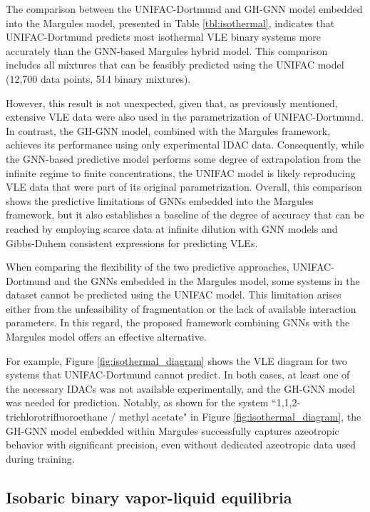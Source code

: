 The comparison between the UNIFAC-Dortmund and GH-GNN model embedded into the Margules model, presented in Table \ref{tbl:isothermal}, indicates that UNIFAC-Dortmund predicts most isothermal VLE binary systems more accurately than the GNN-based Margules hybrid model. This comparison includes all mixtures that can be feasibly predicted using the UNIFAC model (12,700 data points, 514 binary mixtures).

However, this result is not unexpected, given that, as previously mentioned, extensive VLE data were also used in the parametrization of UNIFAC-Dortmund. In contrast, the GH-GNN model, combined with the Margules framework, achieves its performance using only experimental IDAC data. Consequently, while the GNN-based predictive model performs some degree of extrapolation from the infinite regime to finite concentrations, the UNIFAC model is likely reproducing VLE data that were part of its original parametrization. Overall, this comparison shows the predictive limitations of GNNs embedded into the Margules framework, but it also establishes a baseline of the degree of accuracy that can be reached by employing scarce data at infinite dilution with GNN models and Gibbs-Duhem consistent expressions for predicting VLEs.

When comparing the flexibility of the two predictive approaches, UNIFAC-Dortmund and the GNNs embedded in the Margules model, some systems in the dataset cannot be predicted using the UNIFAC model. This limitation arises either from the unfeasibility of fragmentation or the lack of available interaction parameters. In this regard, the proposed framework combining GNNs with the Margules model offers an effective alternative.

For example, Figure \ref{fig:isothermal_diagram} shows the VLE diagram for two systems that UNIFAC-Dortmund cannot predict. In both cases, at least one of the necessary IDACs was not available experimentally, and the GH-GNN model was needed for prediction. Notably, as shown for the system ``1,1,2-trichlorotrifluoroethane / methyl acetate" in Figure \ref{fig:isothermal_diagram}, the GH-GNN model embedded within Margules successfully captures azeotropic behavior with significant precision, even without dedicated azeotropic data used during training.

\subsection{Isobaric binary vapor-liquid equilibria}

